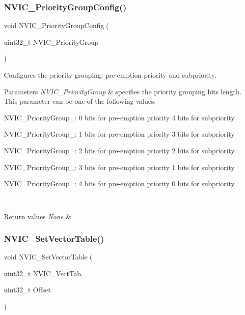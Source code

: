 \subsubsection{\texorpdfstring{NVIC\_PriorityGroupConfig()}{NVIC\_PriorityGroupConfig()}}
{\footnotesize\ttfamily void N\+V\+I\+C\+\_\+\+Priority\+Group\+Config (\begin{DoxyParamCaption}\item[{uint32\+\_\+t}]{N\+V\+I\+C\+\_\+\+Priority\+Group }\end{DoxyParamCaption})}



Configures the priority grouping\+: pre-\/emption priority and subpriority. 


\begin{DoxyParams}{Parameters}
{\em N\+V\+I\+C\+\_\+\+Priority\+Group} & specifies the priority grouping bits length. This parameter can be one of the following values\+: \begin{DoxyItemize}
\item N\+V\+I\+C\+\_\+\+Priority\+Group\+\_\+: 0 bits for pre-\/emption priority 4 bits for subpriority \item N\+V\+I\+C\+\_\+\+Priority\+Group\+\_\+: 1 bits for pre-\/emption priority 3 bits for subpriority \item N\+V\+I\+C\+\_\+\+Priority\+Group\+\_\+: 2 bits for pre-\/emption priority 2 bits for subpriority \item N\+V\+I\+C\+\_\+\+Priority\+Group\+\_\+: 3 bits for pre-\/emption priority 1 bits for subpriority \item N\+V\+I\+C\+\_\+\+Priority\+Group\+\_\+: 4 bits for pre-\/emption priority 0 bits for subpriority \end{DoxyItemize}
\\
\hline
\end{DoxyParams}

\begin{DoxyRetVals}{Return values}
{\em None} & \\
\hline
\end{DoxyRetVals}
\mbox{\label{group___m_i_s_c___private___functions_ga1145208ad70edfc2fab19b8b8ef1b1a1}} 
\subsubsection{\texorpdfstring{NVIC\_SetVectorTable()}{NVIC\_SetVectorTable()}}
{\footnotesize\ttfamily void N\+V\+I\+C\+\_\+\+Set\+Vector\+Table (\begin{DoxyParamCaption}\item[{uint32\+\_\+t}]{N\+V\+I\+C\+\_\+\+Vect\+Tab,  }\item[{uint32\+\_\+t}]{Offset }\end{DoxyParamCaption})}



